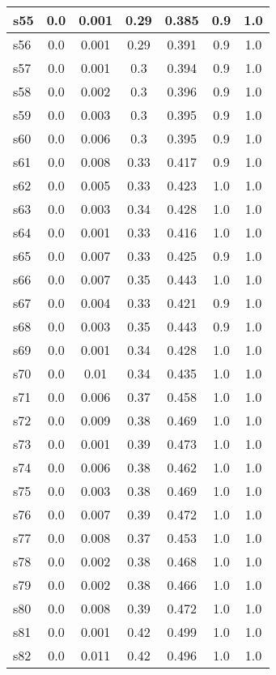 \documentclass{article}
\begin{document}
\begin{tabular}{|l|c|c|c|c|c|c|}
\hline
s55 &0.0 & 0.001 & 0.29 & 0.385 & 0.9 & 1.0\\
\hline
s56 &0.0 & 0.001 & 0.29 & 0.391 & 0.9 & 1.0\\
\hline
s57 &0.0 & 0.001 & 0.3 & 0.394 & 0.9 & 1.0\\
\hline
s58 &0.0 & 0.002 & 0.3 & 0.396 & 0.9 & 1.0\\
\hline
s59 &0.0 & 0.003 & 0.3 & 0.395 & 0.9 & 1.0\\
\hline
s60 &0.0 & 0.006 & 0.3 & 0.395 & 0.9 & 1.0\\
\hline
s61 &0.0 & 0.008 & 0.33 & 0.417 & 0.9 & 1.0\\
\hline
s62 &0.0 & 0.005 & 0.33 & 0.423 & 1.0 & 1.0\\
\hline
s63 &0.0 & 0.003 & 0.34 & 0.428 & 1.0 & 1.0\\
\hline
s64 &0.0 & 0.001 & 0.33 & 0.416 & 1.0 & 1.0\\
\hline
s65 &0.0 & 0.007 & 0.33 & 0.425 & 0.9 & 1.0\\
\hline
s66 &0.0 & 0.007 & 0.35 & 0.443 & 1.0 & 1.0\\
\hline
s67 &0.0 & 0.004 & 0.33 & 0.421 & 0.9 & 1.0\\
\hline
s68 &0.0 & 0.003 & 0.35 & 0.443 & 0.9 & 1.0\\
\hline
s69 &0.0 & 0.001 & 0.34 & 0.428 & 1.0 & 1.0\\
\hline
s70 &0.0 & 0.01 & 0.34 & 0.435 & 1.0 & 1.0\\
\hline
s71 &0.0 & 0.006 & 0.37 & 0.458 & 1.0 & 1.0\\
\hline
s72 &0.0 & 0.009 & 0.38 & 0.469 & 1.0 & 1.0\\
\hline
s73 &0.0 & 0.001 & 0.39 & 0.473 & 1.0 & 1.0\\
\hline
s74 &0.0 & 0.006 & 0.38 & 0.462 & 1.0 & 1.0\\
\hline
s75 &0.0 & 0.003 & 0.38 & 0.469 & 1.0 & 1.0\\
\hline
s76 &0.0 & 0.007 & 0.39 & 0.472 & 1.0 & 1.0\\
\hline
s77 &0.0 & 0.008 & 0.37 & 0.453 & 1.0 & 1.0\\
\hline
s78 &0.0 & 0.002 & 0.38 & 0.468 & 1.0 & 1.0\\
\hline
s79 &0.0 & 0.002 & 0.38 & 0.466 & 1.0 & 1.0\\
\hline
s80 &0.0 & 0.008 & 0.39 & 0.472 & 1.0 & 1.0\\
\hline
s81 &0.0 & 0.001 & 0.42 & 0.499 & 1.0 & 1.0\\
\hline
s82 &0.0 & 0.011 & 0.42 & 0.496 & 1.0 & 1.0\\
\hline

\end{tabular}
\end{document}
